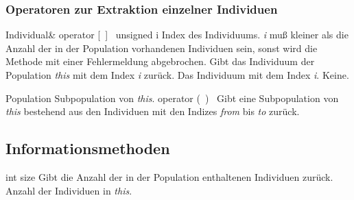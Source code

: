 \documentclass{report}
\begin{document}
\newpage

\subsubsection{Operatoren zur Extraktion einzelner Individuen}

\setNormalInstance
\printMethodWithOneParam
{Individual\&}
{operator [\ ]\ }
{unsigned}
{i}
{Index des Individuums. {\em i} mu{\ss} kleiner als
                        die Anzahl der in der Population vorhandenen
                        Individuen sein, sonst wird die Methode
                        mit einer Fehlermeldung abgebrochen.}
{Gibt das Individuum der Population {\em this} mit dem Index {\em i} 
 zur\"uck.}
{Das Individuum mit dem Index {\em i}.}
{Keine.}

\vspace{4ex}

\setConstInstance
\setCorrectWidthThree{8pt}
\printMethodWithParamsSaved
{Population}
{Subpopulation von {\em this}.}
{operator (\ )\ }
{Gibt eine Subpopulation von {\em this} bestehend aus den Individuen mit den
    Indizes {\em from} bis {\em to} zur\"uck.}
{}
\setCorrectWidthThree{4pt}
\setNormalInstance


\subsection{Informationsmethoden}

\setConstInstance
\printEmptyMethodReturn
{int}
{size}
{Gibt die Anzahl der in der Population enthaltenen Individuen zur\"uck.}
{Anzahl der Individuen in {\em this}.}
\end{document}
